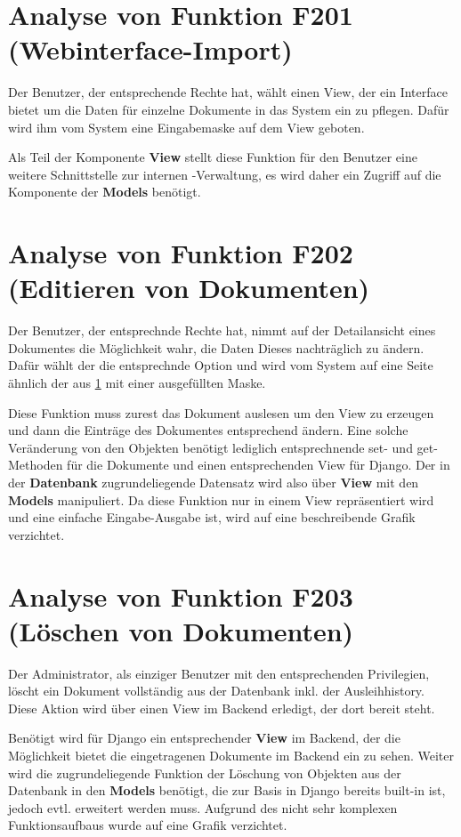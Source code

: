 \section{Analyse von Funktion F201 (Webinterface-Import)}
\label{f:201}
Der Benutzer, der entsprechende Rechte hat, wählt einen View, der ein Interface
bietet um die Daten für einzelne Dokumente in das System ein zu pflegen. Dafür
wird ihm vom System eine Eingabemaske auf dem View geboten.

Als Teil der Komponente \textbf{View} stellt diese Funktion für den
Benutzer eine weitere Schnittstelle zur internen \BibTeX -Verwaltung, es wird
daher ein Zugriff auf die Komponente der \textbf{Models} benötigt.

\section{Analyse von Funktion F202 (Editieren von Dokumenten)}
Der Benutzer, der entsprechnde Rechte hat, nimmt auf der Detailansicht eines
Dokumentes die Möglichkeit wahr, die Daten Dieses nachträglich zu ändern. Dafür
wählt der die entsprechnde Option und wird vom System auf eine Seite ähnlich der
aus \ref{f:201} mit einer ausgefüllten Maske.

Diese Funktion muss zurest das Dokument auslesen um den View zu erzeugen und
dann die Einträge des Dokumentes entsprechend ändern. Eine solche Veränderung
von den Objekten benötigt lediglich entsprechnende set- und get-Methoden für die
Dokumente und einen entsprechenden View für Django. Der in der
\textbf{Datenbank} zugrundeliegende Datensatz wird also über \textbf{View} mit
den \textbf{Models} manipuliert. Da diese Funktion nur in einem View
repräsentiert wird und eine einfache Eingabe-Ausgabe ist, wird auf eine
beschreibende Grafik verzichtet.

\section{Analyse von Funktion F203 (Löschen von Dokumenten)}
Der Administrator, als einziger Benutzer mit den entsprechenden Privilegien,
löscht ein Dokument vollständig aus der Datenbank inkl. der Ausleihhistory.
Diese Aktion wird über einen View im Backend erledigt, der dort bereit steht.

Benötigt wird für Django ein entsprechender \textbf{View} im Backend, der die
Möglichkeit bietet die eingetragenen Dokumente im Backend ein zu sehen. Weiter
wird die zugrundeliegende Funktion der Löschung von Objekten aus der Datenbank
in den \textbf{Models} benötigt, die zur Basis in Django bereits built-in ist,
jedoch evtl. erweitert werden muss. Aufgrund des nicht sehr komplexen
Funktionsaufbaus wurde auf eine Grafik verzichtet.

